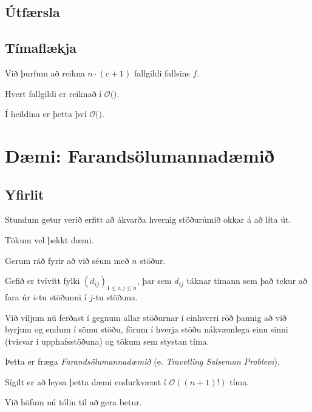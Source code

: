 \subsection{Útfærsla}
{
}

\subsection{Tímaflækja}
{
    {
        \item<1-> Við þurfum að reikna $n \cdot (c + 1)$ fallgildi fallsins $f$.
        \item<2-> Hvert fallgildi er reiknað í $\mathcal{O}($$)$.
        \item<4-> Í heildina er þetta því $\mathcal{O}($$)$.
    }
}

\section{Dæmi: Farandsölumannadæmið}
\subsection{Yfirlit}
{
    {
        \item<1-> Stundum getur verið erfitt að ákvarða hvernig stöðurúmið okkar á að líta út.
        \item<2-> Tökum vel þekkt dæmi.
        \item<3-> Gerum ráð fyrir að við séum með $n$ stöður.
        \item<4-> Gefið er tvívítt fylki $(d_{ij})_{1 \leq i, j \leq n}$,
            þar sem $d_{ij}$ táknar tímann sem það tekur að fara úr $i$-tu stöðunni í $j$-tu stöðuna.
        \item<5-> Við viljum nú ferðast í gegnum allar stöðurnar í einhverri röð þannig að við	
            byrjum og endum í sömu stöðu, förum í hverja stöðu nákvæmlega einu sinni (tvisvar í upphafsstöðuna) og tökum sem stystan tíma.
        \item<6-> Þetta er fræga \emph{Farandsölumannadæmið} (e. \emph{Travelling Salseman Problem}).
        \item<7-> Sígilt er að leysa þetta dæmi endurkvæmt í $\mathcal{O}((n + 1)!)$ tíma.
        \item<8-> Við höfum nú tólin til að gera betur.
    }
}


